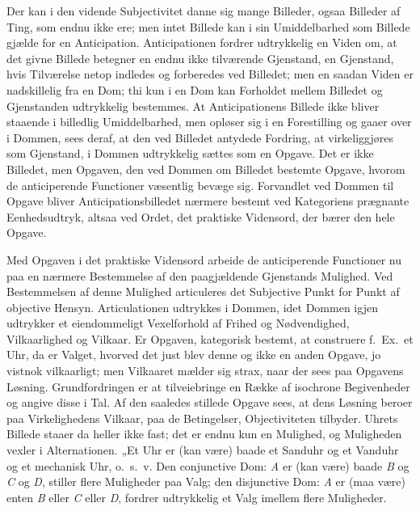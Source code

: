 \documentclass[12pt]{book}
\newcommand{\opage}[1]{\marginnote{\footnotesize\textit{[#1]}}}
\begin{document}
Der kan i den vidende Subjectivitet danne sig mange
Billeder, ogsaa Billeder af Ting, som endnu ikke ere; men
intet Billede kan i sin Umiddelbarhed som Billede gjælde for
en Anticipation. Anticipationen fordrer udtrykkelig en Viden
om, at det givne Billede betegner en endnu ikke tilværende
Gjenstand, en Gjenstand, hvis Tilværelse netop indledes og
forberedes ved Billedet; men en saadan Viden er nadskillelig %
fra en Dom; thi kun i en Dom kan Forholdet mellem
Billedet og Gjenstanden udtrykkelig bestemmes. At Anticipationens
Billede ikke bliver staaende i billedlig Umiddelbarhed,
men opløser sig i en Forestilling og gaaer over i Dommen,
sees deraf, at den ved Billedet antydede Fordring, at virkeliggjøres
som Gjenstand, i Dommen udtrykkelig sættes som en
Opgave. Det er ikke Billedet, men Opgaven, den ved Dommen
om Billedet bestemte Opgave, hvorom de anticiperende Functioner
væsentlig bevæge sig. Forvandlet ved Dommen til
Opgave bliver Anticipationsbilledet nærmere bestemt ved Kategoriens
prægnante Eenhedsudtryk, altsaa ved Ordet, det praktiske
Vidensord, der bærer den hele Opgave.

Med Opgaven i det praktiske Vidensord arbeide de anticiperende
Functioner nu paa en nærmere Bestemmelse af
den paagjældende Gjenstands Mulighed. Ved Bestemmelsen
af denne Mulighed articuleres det Subjective Punkt for Punkt
af objective Hensyn. Articulationen udtrykkes i Dommen,
\opage{127}idet Dommen igjen udtrykker et eiendommeligt Vexelforhold
af Frihed og Nødvendighed, Vilkaarlighed og Vilkaar. Er
Opgaven, kategorisk bestemt, at construere f.\ Ex.\ et Uhr, da
er Valget, hvorved det just blev denne og ikke en anden Opgave,
jo vistnok vilkaarligt; men Vilkaaret mælder sig strax,
naar der sees paa Opgavens Løsning. Grundfordringen er
at tilveiebringe en Række af isochrone Begivenheder og angive
disse i Tal. Af den saaledes stillede Opgave sees, at dens
Løsning beroer paa Virkelighedens Vilkaar, paa de Betingelser,
Objectiviteten tilbyder. Uhrets Billede staaer da heller ikke
fast; det er endnu kun en Mulighed, og Muligheden vexler
i Alternationen. „Et Uhr er (kan være) baade et Sanduhr
og et Vanduhr og et mechanisk Uhr, o.\ s.\ v. %
Den conjunctive
Dom: \textit{A} er (kan være) baade \textit{B} og \textit{C} og \textit{D}, stiller
flere Muligheder paa Valg; den disjunctive Dom: \textit{A} er (maa
være) enten \textit{B} eller \textit{C} eller \textit{D}, fordrer udtrykkelig et Valg
imellem flere Muligheder.
\end{document}
